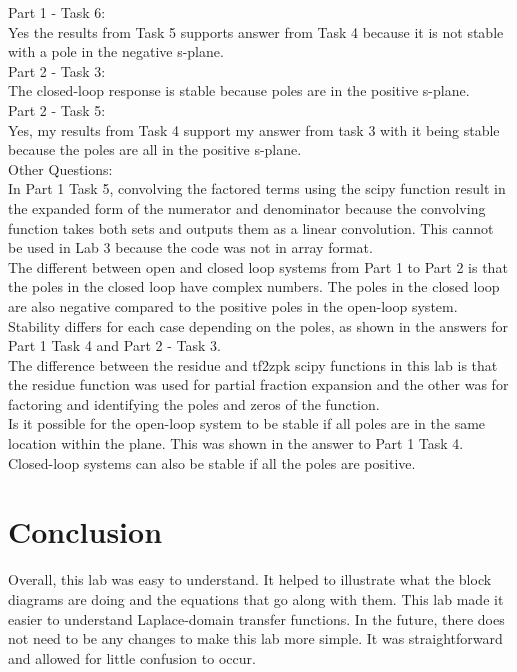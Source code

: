 \documentclass[12pt]{report}
\begin{document}
\noindent Part 1 - Task 6:\\

Yes the results from Task 5 supports answer from Task 4 because it is not stable with a pole in the negative s-plane.\\

\noindent Part 2 - Task 3:\\

 The closed-loop response is stable because poles are in the positive s-plane.\\
 
\noindent Part 2 - Task 5:\\

Yes, my results from Task 4 support my answer from task 3 with it being stable because the poles are all in the positive s-plane.\\

\noindent Other Questions:\\

\noindent In Part 1 Task 5, convolving the factored terms using the scipy function result in the expanded form of the numerator and denominator because the convolving function takes both sets and outputs them as a linear convolution. This cannot be used in Lab 3 because the code was not in array format.  \\

\noindent The different between open and closed loop systems from Part 1 to Part 2 is that the poles in the closed loop have complex numbers. The poles in the closed loop are also negative compared to the positive poles in the open-loop system. Stability differs for each case depending on the poles, as shown in the answers for Part 1 Task 4 and Part 2 - Task 3.\\

\noindent The difference between the residue and tf2zpk scipy functions in this lab is that the residue function was used for partial fraction expansion and the other was for factoring and identifying the poles and zeros of the function. \\

\noindent Is it possible for the open-loop system to be stable if all poles are in the same location within the plane. This was shown in the answer to Part 1 Task 4. Closed-loop systems can also be stable if all the poles are positive. 

\section{Conclusion}
Overall, this lab was easy to understand. It helped to illustrate what the block diagrams are doing and the equations that go along with them. This lab made it easier to understand Laplace-domain transfer functions. In the future, there does not need to be any changes to make this lab more simple. It was straightforward and allowed for little confusion to occur. 
\end{document}
